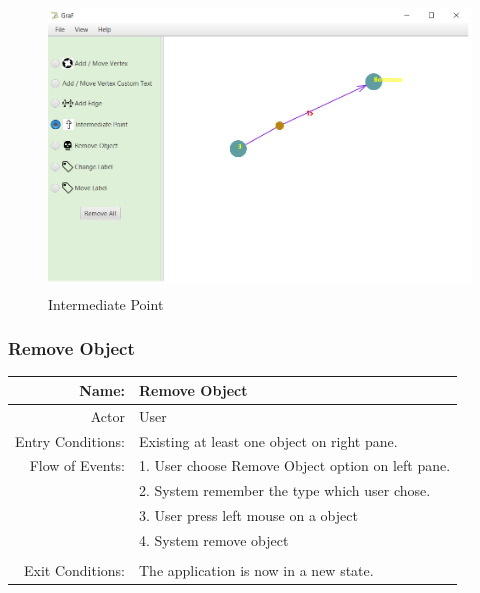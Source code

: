 \documentclass[a4paper,10pt]{article}
\begin{document}
\begin{figure}[H]
		\centering
		\includegraphics[height = 3in]{IntermediatePoint.png}
		\caption[Optional caption]{Intermediate Point}
		\label{fig:Repository}
	\end{figure}
\paragraph{}

\subsubsection{Remove Object}
	\begin{tabular}{|r|l|}
\hline
Name: & Remove Object \\
\hline
Actor & User \\
\hline
Entry Conditions: & Existing at least one object on right pane. \\
\hline
Flow of Events: & 1. User choose Remove Object option on left pane. \\
& 2. System remember the type which user chose.  \\
& 3. User press left mouse on a object  \\
& 4. System remove object  \\
\\
\hline
Exit Conditions: & The application is now in a new state. \\
\hline

\end{tabular}
\end{document}
